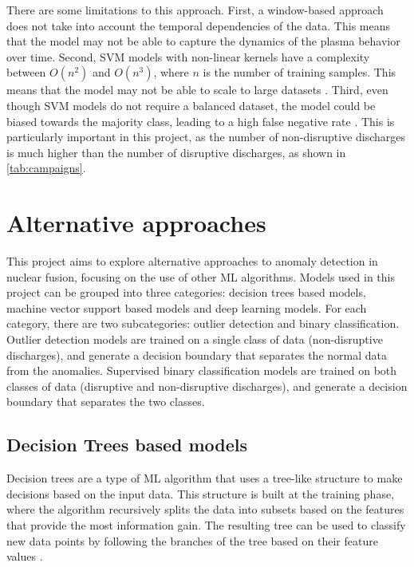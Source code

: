 There are some limitations to this approach. First, a window-based approach does not take into account the temporal dependencies of the data. This means that the model may not be able to capture the dynamics of the plasma behavior over time. Second, \ac{SVM} models with non-linear kernels have a complexity between $O(n^2)$ and $O(n^3)$, where $n$ is the number of training samples. This means that the model may not be able to scale to large datasets \autocite{kekulawalaSupportVectorMachines2024}. Third, even though \ac{SVM} models do not require a balanced dataset, the model could be biased towards the majority class, leading to a high false negative rate \autocite{10.1007/978-3-540-30115-8_7}. This is particularly important in this project, as the number of non-disruptive discharges is much higher than the number of disruptive discharges, as shown in \autoref{tab:campaigns}.

\section{Alternative approaches}

This project aims to explore alternative approaches to anomaly detection in nuclear fusion, focusing on the use of other \ac{ML} algorithms. Models used in this project can be grouped into three categories: decision trees based models, machine vector support based models and deep learning models. For each category, there are two subcategories: outlier detection and binary classification. Outlier detection models are trained on a single class of data (non-disruptive discharges), and generate a decision boundary that separates the normal data from the anomalies. Supervised binary classification models are trained on both classes of data (disruptive and non-disruptive discharges), and generate a decision boundary that separates the two classes.

\subsection{Decision Trees based models}

Decision trees are a type of \ac{ML} algorithm that uses a tree-like structure to make decisions based on the input data. This structure is built at the training phase, where the algorithm recursively splits the data into subsets based on the features that provide the most information gain. The resulting tree can be used to classify new data points by following the branches of the tree based on their feature values \autocite{1522531}.

